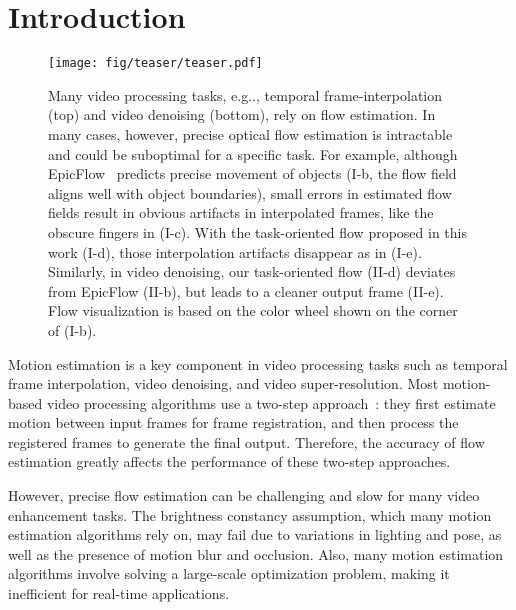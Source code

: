 \documentclass[twocolumn,natbib]{svjour3}          \smartqed  \usepackage{graphicx}
\makeatletter
\DeclareRobustCommand\onedot{\futurelet\@let@token\@onedot}
\def\@onedot{\ifx\@let@token.\else.\null\fi\xspace}
\def\eg{e.g\onedot} \def\Eg{E.g\onedot}
\makeatother
\begin{document}
 
\section{Introduction}
\label{sec:intro}


\begin{figure*}[t]
    \centering
    \texttt{[image: fig/teaser/teaser.pdf]}
\caption{
    Many video processing tasks, \eg, temporal frame-interpolation (top) and video denoising (bottom), rely on flow estimation. In many cases, however, precise optical flow estimation is intractable and could be suboptimal for a specific task. For example, although EpicFlow~\citep{Revaud2015Epicflow} predicts precise movement of objects (I-b, the flow field aligns well with object boundaries), small errors in estimated flow fields result in obvious artifacts in interpolated frames, like the obscure fingers in (I-c). With the task-oriented flow proposed in this work (I-d), those interpolation artifacts disappear as in (I-e). Similarly, in video denoising, our task-oriented flow (II-d) deviates from EpicFlow (II-b), but leads to a cleaner output frame (II-e). Flow visualization is based on the color wheel shown on the corner of (I-b).
    }
    \label{fig:teaser} 
\end{figure*}
 
Motion estimation is a key component in video processing tasks such as temporal frame interpolation, video denoising, and video super-resolution. Most motion-based video processing algorithms use a two-step approach~\citep{liu2011bayesian,baker2011database,liu2010high}: they first estimate motion between input frames for frame registration, and then process the registered frames to generate the final output. Therefore, the accuracy of flow estimation greatly affects the performance of these two-step approaches.

However, precise flow estimation can be challenging and slow for many video enhancement tasks. The brightness constancy assumption, which many motion estimation algorithms rely on, may fail due to variations in lighting and pose, as well as the presence of motion blur and occlusion. Also, many motion estimation algorithms involve solving a large-scale optimization problem, making it inefficient for real-time applications. 
\end{document}
